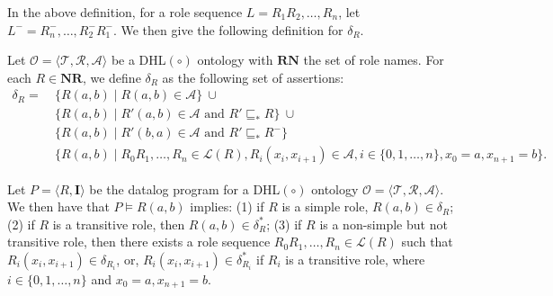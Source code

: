 In the above definition, for a role sequence $L=R_1R_2,\ldots ,R_n$, let $L^-=R_n^-,\ldots ,R_2^-R_1^-$.
We then give the following definition for $\delta_R$.

\begin{definition}\label{def:deltaRdhlplus}
Let $\mathcal{O}=\langle\mathcal{T},\mathcal{R},\mathcal{A}\rangle$ be
a DHL$(\circ)$ ontology with $\textbf{RN}$ the set of role names. For each
$R\in\textbf{NR}$, we define $\delta_R$ as the following set of assertions:
\begin{align*}
\delta_R =\ & \{ R(a,b) \mid R(a,b) \in\mathcal{A} \}\ \cup\\
& \{ R(a,b) \mid R'(a,b)\in\mathcal{A} \text{ and } R' \sqsubseteq_{*}
  R \}\ \cup\\
& \{ R(a,b) \mid R'(b,a)\in\mathcal{A} \text{ and } R'\sqsubseteq_{*}
  R^- \}\\
& \{ R(a,b) \mid R_0R_1,\ldots,R_n\in\mathcal{L}(R),
  R_i(x_i,x_{i+1})\in\mathcal{A}, i\in\{0,1,\ldots ,n\}, x_0=a, x_{n+1}=b \}.
\end{align*}
\end{definition}

\begin{lemma}\label{lemma:tiplus}
Let
    $P=\langle R, \textbf{I}\rangle$ be the datalog program for a DHL$(\circ)$
    ontology
    $\mathcal{O}=\langle\mathcal{T},\mathcal{R},\mathcal{A}\rangle$. We
  then have that
$P\models R(a,b)$ implies: (1) if $R$ is a simple role, $R(a,b)\in\delta_R$;
(2) if $R$ is a transitive role, then $R(a,b)\in\delta^*_R$;
(3) if $R$ is a non-simple but not transitive role, then there exists a role sequence $R_0R_1,\ldots ,R_n\in\mathcal{L}(R)$ such that
$R_i(x_i,x_{i+1})\in\delta_{R_i}$, or, $R_i(x_i,x_{i+1})\in\delta^*_{R_i}$ if $R_i$ is a transitive role,
where $i\in\{0,1,\ldots ,n\}$ and $x_0=a, x_{n+1}=b$.
\end{lemma}


